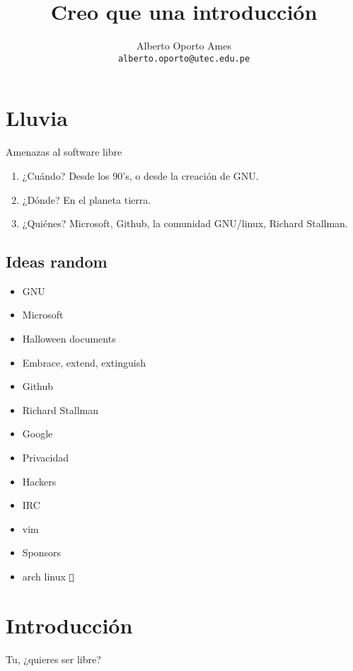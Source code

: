 \documentclass[12pt]{article}
\title{\textbf{Creo que una introducción}}
\author{
		Alberto Oporto Ames\\
		\texttt{alberto.oporto@utec.edu.pe}
		}
\begin{document}
\maketitle
\thispagestyle{fancy}

\section{Lluvia}
\label{sec:Lluvia}

Amenazas al software libre

\begin{enumerate}
	\item ¿Cuándo?
		\subitem Desde los 90's, o desde la creación de GNU.
	\item ¿Dónde?
		\subitem En el planeta tierra.
	\item ¿Quiénes?
		\subitem Microsoft, Github, la comunidad GNU/linux, Richard Stallman.
\end{enumerate}
\subsection{Ideas random}%
\label{sub:Ideas random}
\begin{itemize}
	\item GNU
	\item Microsoft
	\item Halloween documents
	\item Embrace, extend, extinguish
	\item Github
	\item Richard Stallman
	\item Google
	\item Privacidad
	\item Hackers
	\item IRC
	\item vim
	\item Sponsors
	\item arch linux {\color{arch}\texttt{ }}
\end{itemize}
\section{Introducción}%
\label{sec:Introducción}

Tu, ¿quieres ser libre?
\end{document}
